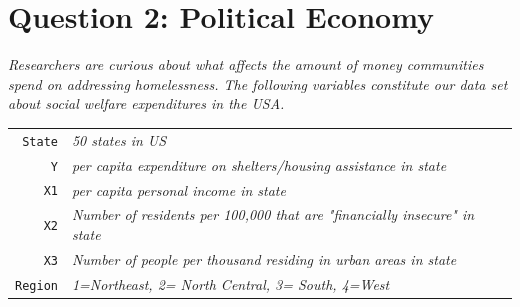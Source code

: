 \documentclass[12pt,letterpaper]{article}
\begin{document}
	\section*{Question 2: Political Economy }
	
	\textit{Researchers are curious about what affects the amount of money communities spend on addressing homelessness. The following variables constitute our data set about social welfare expenditures in the USA.}\\
			\vspace{.5cm}
			
\begin{tabular}{r|l}
	\texttt{State} &\emph{50 states in US} \\
	\texttt{Y} & \emph{per capita expenditure on shelters/housing assistance in state}\\
	\texttt{X1} &\emph{per capita personal income in state} \\
	\texttt{X2} &  \emph{Number of residents per 100,000 that are "financially insecure" in state}\\
	\texttt{X3} &  \emph{Number of people per thousand residing in urban areas in state} \\
	\texttt{Region} &  \emph{1=Northeast, 2= North Central, 3= South, 4=West} \\
\end{tabular}

			\vspace{.5cm}
			\vspace{.5cm}
		
		\vspace{.5cm}
		\vspace{.25cm}
		
  
			
\end{document}
